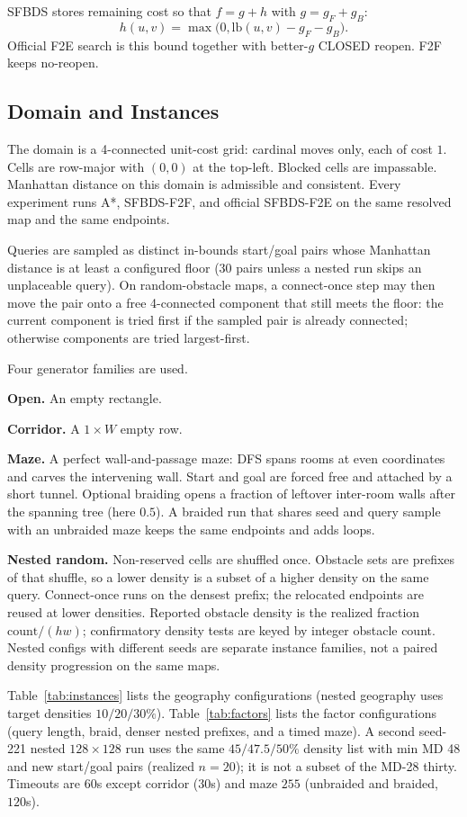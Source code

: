 SFBDS stores remaining cost so that \(f=g+h\) with \(g=g_F+g_B\):
\[
h(u,v)=\max\bigl(0,\mathrm{lb}(u,v)-g_F-g_B\bigr).
\]
Official F2E search is this bound together with better-\(g\) CLOSED reopen. F2F keeps no-reopen.

\subsection{Domain and Instances}

The domain is a 4-connected unit-cost grid: cardinal moves only, each of cost \(1\). Cells are row-major with \((0,0)\) at the top-left. Blocked cells are impassable. Manhattan distance on this domain is admissible and consistent. Every experiment runs A*, SFBDS-F2F, and official SFBDS-F2E on the same resolved map and the same endpoints.

Queries are sampled as distinct in-bounds start/goal pairs whose Manhattan distance is at least a configured floor (30 pairs unless a nested run skips an unplaceable query). On random-obstacle maps, a connect-once step may then move the pair onto a free 4-connected component that still meets the floor: the current component is tried first if the sampled pair is already connected; otherwise components are tried largest-first.

Four generator families are used.

\textbf{Open.} An empty rectangle.

\textbf{Corridor.} A \(1\times W\) empty row.

\textbf{Maze.} A perfect wall-and-passage maze: DFS spans rooms at even coordinates and carves the intervening wall. Start and goal are forced free and attached by a short tunnel. Optional braiding opens a fraction of leftover inter-room walls after the spanning tree (here \(0.5\)). A braided run that shares seed and query sample with an unbraided maze keeps the same endpoints and adds loops.

\textbf{Nested random.} Non-reserved cells are shuffled once. Obstacle sets are prefixes of that shuffle, so a lower density is a subset of a higher density on the same query. Connect-once runs on the densest prefix; the relocated endpoints are reused at lower densities. Reported obstacle density is the realized fraction \(\mathrm{count}/(hw)\); confirmatory density tests are keyed by integer obstacle count. Nested configs with different seeds are separate instance families, not a paired density progression on the same maps.

Table~\ref{tab:instances} lists the geography configurations (nested geography uses target densities \(10/20/30\%\)). Table~\ref{tab:factors} lists the factor configurations (query length, braid, denser nested prefixes, and a timed maze). A second seed-221 nested \(128\times 128\) run uses the same \(45/47.5/50\%\) density list with min MD 48 and new start/goal pairs (realized \(n=20\)); it is not a subset of the MD-28 thirty. Timeouts are \(60\)s except corridor (\(30\)s) and maze \(255\) (unbraided and braided, \(120\)s).

